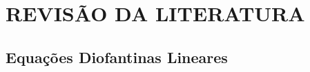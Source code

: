 \section{REVISÃO DA LITERATURA}

	\subsection{Equações Diofantinas Lineares} \label{subsec:diofantinas}
	